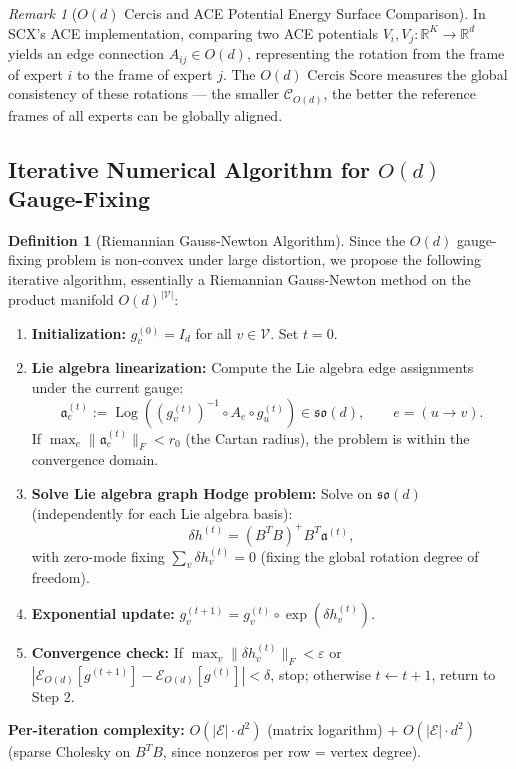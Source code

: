 \documentclass[12pt,a4paper]{article}
\theoremstyle{definition}
\newtheorem{definition}{Definition}[section]
\theoremstyle{remark}
\newtheorem{remark}{Remark}[section]
\theoremstyle{definition}
\newcommand{\R}{\mathbb{R}}
\newcommand{\Od}{O(d)}
\newcommand{\verts}{\mathcal{V}}
\newcommand{\edgs}{\mathcal{E}}
\newcommand{\cercis}{\mathcal{C}}
\DeclareMathOperator{\Log}{Log}
\begin{document}
\begin{remark}[$O(d)$ Cercis and ACE Potential Energy Surface Comparison]
In SCX's ACE implementation, comparing two ACE potentials $V_i, V_j: \R^K \to \R^d$ yields an edge connection $A_{ij} \in \Od$,
representing the rotation from the frame of expert $i$ to the frame of expert $j$. The $O(d)$ Cercis Score measures the global
consistency of these rotations — the smaller $\cercis_{\Od}$, the better the reference frames of all experts can be globally aligned.
\end{remark}

\subsection{Iterative Numerical Algorithm for $O(d)$ Gauge-Fixing}

\begin{definition}[Riemannian Gauss-Newton Algorithm]\label{def:od_algorithm}
Since the $O(d)$ gauge-fixing problem is non-convex under large distortion, we propose the following iterative algorithm,
essentially a Riemannian Gauss-Newton method on the product manifold $\Od^{|\verts|}$:

\begin{enumerate}[label=Step \arabic*:, leftmargin=*]
    \item \textbf{Initialization:} $g^{(0)}_v = I_d$ for all $v \in \verts$. Set $t = 0$.

    \item \textbf{Lie algebra linearization:} Compute the Lie algebra edge assignments under the current gauge:
    \[
        \mathfrak{a}_e^{(t)} := \Log\left((g_v^{(t)})^{-1} \circ A_e \circ g_u^{(t)}\right) \in \mathfrak{so}(d),
        \qquad e = (u \to v).
    \]
    If $\max_e \|\mathfrak{a}_e^{(t)}\|_F < r_0$ (the Cartan radius), the problem is within the convergence domain.

    \item \textbf{Solve Lie algebra graph Hodge problem:} Solve on $\mathfrak{so}(d)$ (independently for each Lie algebra basis):
    \[
        \delta h^{(t)} = (B^T B)^+ B^T \boldsymbol{\mathfrak{a}}^{(t)},
    \]
    with zero-mode fixing $\sum_v \delta h_v^{(t)} = 0$ (fixing the global rotation degree of freedom).

    \item \textbf{Exponential update:} $g_v^{(t+1)} = g_v^{(t)} \circ \exp(\delta h_v^{(t)})$.

    \item \textbf{Convergence check:} If $\max_v \|\delta h_v^{(t)}\|_F < \varepsilon$ or $|\mathcal{E}_{\Od}[g^{(t+1)}] - \mathcal{E}_{\Od}[g^{(t)}]| < \delta$, stop;
    otherwise $t \leftarrow t+1$, return to Step 2.
\end{enumerate}

\textbf{Per-iteration complexity:} $O(|\edgs| \cdot d^2)$ (matrix logarithm) + $O(|\edgs| \cdot d^2)$ (sparse Cholesky on $B^T B$, since nonzeros per row = vertex degree).
\end{definition}
\end{document}
